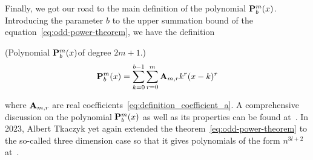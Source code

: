 Finally, we got our road to the main definition of the polynomial ${\mathbf{P}}\sp{m} \sb{b}(x)$.
Introducing the parameter $b$ to the upper summation bound of the equation~\eqref{eq:odd-power-theorem},
we have the definition
\begin{defn} (Polynomial ${\mathbf{P}}\sp{m} \sb{b}(x) $of degree $2m+1$.)
    \begin{equation}
        {\mathbf{P}}\sp{m} \sb{b}(x) = \sum_{k=0}^{b-1} \sum_{r=0}^{m} {\mathbf{A}} \sb{m,r} k^r(x-k)^r
        \label{eq:definition_polynomial_p}
    \end{equation}
\end{defn}
where ${\mathbf{A}} \sb{m,r}$ are real coefficients~\eqref{eq:definition_coefficient_a}.
A comprehensive discussion on the polynomial ${\mathbf{P}}\sp{m} \sb{b}(x)$ as well as its properties can be found at~\cite{kolosov2016link}.
In 2023, Albert Tkaczyk yet again extended the theorem~\eqref{eq:odd-power-theorem} to the so-called three dimension case
so that it gives polynomials of the form $n^{3l+2}$ at~\cite{albert_tkaczyk_2023_8371454}.
